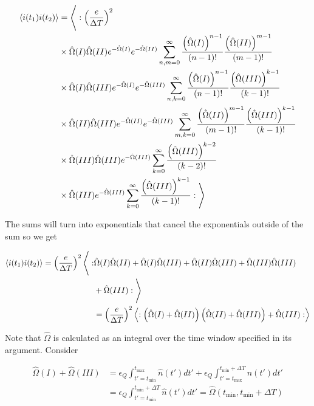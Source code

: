 \documentclass[12pt]{article}
\newcommand{\ep}{\epsilon}
\begin{document}
\begin{align}
\Braket{i(t_1)i(t_2)} &= \Bigg \langle: \left(\frac{e}{\Delta T}\right)^2 \\
&\times \hat{\Omega}(I)\hat{\Omega}(II) e^{-\hat{\Omega}(I)}e^{-\hat{\Omega}(II)}\sum_{n,m=0}^{\infty} \frac{\left(\hat{\Omega}(I)\right)^{n-1}}{(n-1)!}\frac{\left(\hat{\Omega}(II)\right)^{m-1}}{(m-1)!}\\
&\times \hat{\Omega}(I)\hat{\Omega}(III) e^{-\hat{\Omega}(I)}e^{-\hat{\Omega}(III)}\sum_{n,k=0}^{\infty} \frac{\left(\hat{\Omega}(I)\right)^{n-1}}{(n-1)!}\frac{\left(\hat{\Omega}(III)\right)^{k-1}}{(k-1)!}\\
&\times \hat{\Omega}(II)\hat{\Omega}(III) e^{-\hat{\Omega}(II)}e^{-\hat{\Omega}(III)}\sum_{m,k=0}^{\infty} \frac{\left(\hat{\Omega}(II)\right)^{m-1}}{(m-1)!}\frac{\left(\hat{\Omega}(III)\right)^{k-1}}{(k-1)!}\\
&\times \hat{\Omega}(III)\hat{\Omega}(III) e^{-\hat{\Omega}(III)}\sum_{k=0}^{\infty} \frac{\left(\hat{\Omega}(III)\right)^{k-2}}{(k-2)!}\\
&\times \hat{\Omega}(III) e^{-\hat{\Omega}(III)}\sum_{k=0}^{\infty} \frac{\left(\hat{\Omega}(III)\right)^{k-1}}{(k-1)!} : \Bigg \rangle
\end{align}

The sums will turn into exponentials that cancel the exponentials outside of the sum so we get

\begin{align}
\Braket{i(t_1)i(t_2)} = \left( \frac{e}{\Delta T} \right)^2 \Bigg \langle:&\hat{\Omega}(I)\hat{\Omega}(II)  + \hat{\Omega}(I)\hat{\Omega}(III)  + \hat{\Omega}(II)\hat{\Omega}(III)  + \hat{\Omega}(III)\hat{\Omega}(III)\\
& + \hat{\Omega}(III)  :\Bigg \rangle\\
&= \left(\frac{e}{\Delta T} \right)^2 \Braket{:\left(\hat{\Omega}(I)+\hat{\Omega}(II)\right)\left(\hat{\Omega}(II)+\hat{\Omega}(III) \right) + \hat{\Omega}(III):}
\end{align}

Note that $\hat{\Omega}$ is calculated as an integral over the time window specified in its argument. Consider 

\begin{align}
\hat{\Omega}(I) + \hat{\Omega}(III) &= \ep_Q\int_{t'=t_{\text{min}}}^{t_{\text{max}}}\hat{n}(t') dt' + \ep_Q\int_{t'=t_{\text{max}}}^{t_{\text{min}}+\Delta T}\hat{n}(t') dt'\\
&=\ep_Q\int_{t'=t_{\text{min}}}^{t_{\text{min}}+\Delta T}\hat{n}(t') dt' = \hat{\Omega}(t_{\text{min}},t_{\text{min}}+\Delta T)
\end{align}
\end{document}
